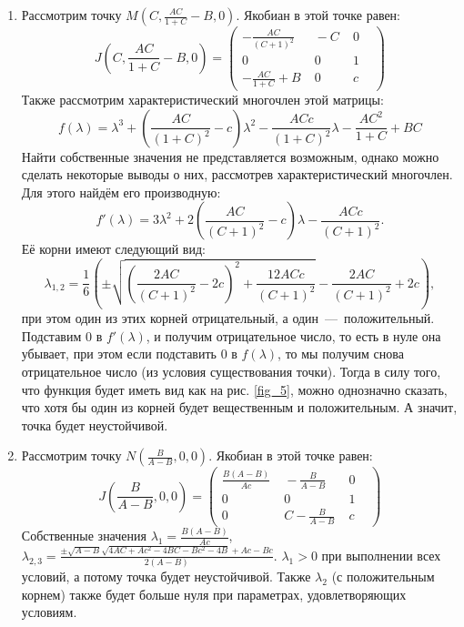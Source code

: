 \documentclass{article}
\begin{document}
\begin{enumerate}
\item Рассмотрим точку $M \left(C, \frac{AC}{1 + C} - B, 0\right)$. Якобиан в этой точке равен:
\begin{equation*}
J\left(C, \frac{AC}{1 + C} - B, 0\right) = \begin{pmatrix} - \frac{AC}{(C+1)^2} & \;  -C & \; 0 &\\ 0 &\; 0 & \; 1 & \\ -\frac{AC}{1 + C} + B & \;0 & \; c &\end{pmatrix}
\end{equation*}
Также рассмотрим характеристический многочлен этой матрицы:
\begin{equation*}
f(\lambda) = \lambda^3 + \left(\frac{AC}{(1 + C)^2} - c\right) \lambda^2 - \frac{ACc}{(1+C)^2}\lambda - \frac{A C^2}{1+C} + BC
\end{equation*}
Найти собственные значения не представляется возможным, однако можно сделать некоторые выводы о них, рассмотрев характеристический многочлен. Для этого найдём его производную:
\begin{equation*}
f'(\lambda) = 3 \lambda^2 + 2 \left(\frac{AC}{(C+1)^2} - c\right)\lambda - \frac{ACc}{(C+1)^2}.
\end{equation*}
Её корни имеют следующий вид:
\begin{equation*}
\lambda_{1,2} = \frac{1}{6} \left(\pm\sqrt{\left(\frac{2AC}{(C+1)^2} - 2c\right)^2 + \frac{12 ACc}{(C+1)^2}} - \frac{2AC}{(C+1)^2} + 2c\right),
\end{equation*}
при этом один из этих корней отрицательный, а один~---~положительный. Подставим $0$ в $f'(\lambda)$, и получим отрицательное число, то есть в нуле она убывает, при этом если подставить $0$ в $f(\lambda)$, то мы получим снова отрицательное число (из условия существования точки). Тогда в силу того, что функция будет иметь вид как на рис. \ref{fig_5}, можно однозначно сказать, что хотя бы один из корней будет вещественным и положительным. А значит, точка будет неустойчивой. 

\item Рассмотрим точку $N\left(\frac{B}{A-B}, 0, 0\right)$. Якобиан в этой точке равен:
\begin{equation*}
J\left(\frac{B}{A-B}, 0, 0\right) = \begin{pmatrix} \frac{B(A-B)}{Ac} & \;  -\frac{B}{A-B} & \; 0 &\\ 0 &\; 0 & \; 1 & \\ 0 & \; C -\frac{B}{A-B}& \; c &\end{pmatrix}
\end{equation*}
Собственные значения $\lambda_1=\frac{B(A-B)}{Ac}$, $\lambda_{2,3} = \frac{\pm \sqrt{A-B} \sqrt{4AC + Ac^2 - 4BC - Bc^2 - 4B} + Ac - Bc}{2(A-B)}$. $\lambda_1>0$ при выполнении всех условий, а потому точка будет неустойчивой. Также $\lambda_2$ (с положительным корнем) также будет больше нуля при параметрах, удовлетворяющих условиям.

\end{enumerate}
\end{document}
